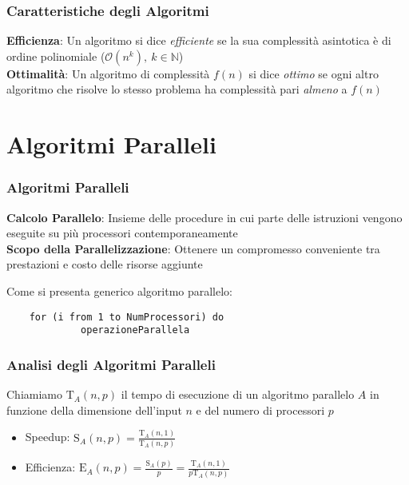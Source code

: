 \documentclass[14pt]{beamer}
\begin{document}

\begin{frame}
\frametitle{Caratteristiche degli Algoritmi}
\textbf{Efficienza}: Un algoritmo si dice \textit{efficiente} se la sua complessità asintotica è di ordine polinomiale ($\mathcal{O}(n^k), \ k \in \mathbb{N}$)\\[2ex]
\textbf{Ottimalità}: Un algoritmo di complessità $f(n)$ si dice \textit{ottimo} se ogni altro algoritmo che risolve lo stesso problema ha complessità pari \textit{almeno} a $f(n)$
\end{frame}



\section{Algoritmi Paralleli}
\begin{frame}
\frametitle{Algoritmi Paralleli}
\textbf{Calcolo Parallelo}: Insieme delle procedure in cui parte delle istruzioni vengono eseguite su più processori contemporaneamente\\[2ex]
\textbf{Scopo della Parallelizzazione}: Ottenere un compromesso conveniente tra prestazioni e costo delle risorse aggiunte
\end{frame}


\begin{frame}[fragile]
Come si presenta generico algoritmo parallelo:\\[2ex]
\begin{verbatim}
    for (i from 1 to NumProcessori) do
             operazioneParallela
\end{verbatim}
\end{frame}


\begin{frame}
\frametitle{Analisi degli Algoritmi Paralleli}
Chiamiamo $\mathrm{T}_{A}(n, p)$ il tempo di esecuzione di un algoritmo parallelo $A$ in funzione della dimensione dell'input $n$ e del numero di processori $p$\\[2ex]
\begin{itemize}
\item{Speedup}: $\displaystyle \mathrm{S}_{A}(n, p) = \frac{\mathrm{T}_{A}(n, 1)}{\mathrm{T}_{A}(n, p)}$\\[2ex]
\item{Efficienza}: $\displaystyle \mathrm{E}_{A}(n, p) = \frac{\mathrm{S}_{A}(p)}{p} = \frac{\mathrm{T}_{A}(n, 1)}{p\mathrm{T}_{A}(n, p)}$
\end{itemize}
\end{frame}
\end{document}
